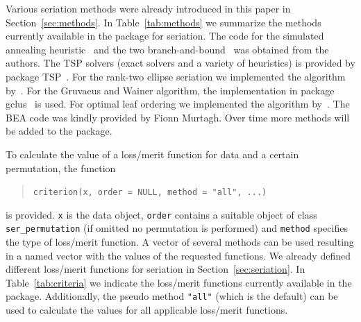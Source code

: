 \documentclass[fleqn, a4paper]{article}
\newcommand{\strong}[1]{{\normalfont\fontseries{b}\selectfont #1}}
\newcommand{\code}[1]{\mbox{\texttt{#1}}}
\newcommand{\pkg}[1]{\strong{#1}}
\begin{document}
Various seriation methods were already introduced in this paper in
Section~\ref{sec:methods}. In Table~\ref{tab:methods} we summarize the methods
currently available in the package for seriation.  The code for the simulated
annealing heuristic~\citep{seriation:Brusco:2007} and the two
branch-and-bound~\citep{seriation:Brusco:2005} was obtained from the authors.
The TSP solvers (exact solvers and a variety of heuristics) is provided by
package \pkg{TSP}~\citep{seriation:Hahsler:2007}.  For the rank-two ellipse
seriation we implemented the algorithm by~\cite{seriation:Chen:2002}.  For the
Gruvaeus and Wainer algorithm, the implementation in package
\pkg{gclus}~\citep{seriation:Hurley:2007} is used.  For optimal leaf ordering we
implemented the algorithm by~\cite{seriation:Bar-Joseph:2001}.  The BEA code
was kindly provided by Fionn Murtagh.  Over time more methods will be added to
the package.

To calculate the value of a loss/merit function for data and 
a certain permutation, the function
\begin{quotation}
\code{criterion(x, order = NULL, method = "all", ...)} 
\end{quotation}
is provided. \code{x} is the data object, \code{order} contains a suitable
object of class \code{ser\_permutation} (if omitted no permutation is
performed) and \code{method} specifies the type of loss/merit function. A
vector of several methods can be used resulting in a named vector
with the values of the requested functions.  We already
defined different loss/merit functions for seriation in
Section~\ref{sec:seriation}.  In Table~\ref{tab:criteria} we indicate the
loss/merit functions currently available in the package.  Additionally, the
pseudo method \code{"all"} (which is the default) can be used to calculate
the values for all applicable loss/merit functions.
\end{document}
